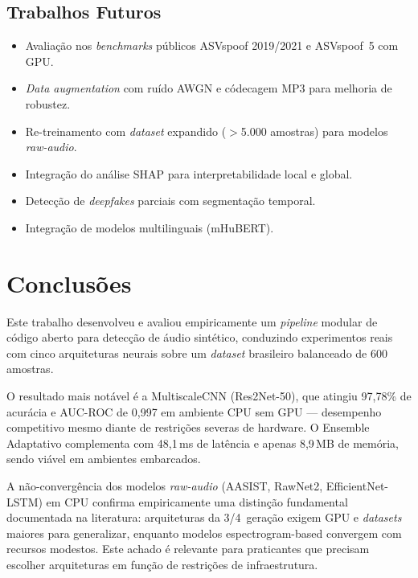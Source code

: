 \documentclass[12pt,a4paper]{article}
\begin{document}
\subsection{Trabalhos Futuros}

\begin{itemize}
    \item Avalia\c{c}\~{a}o nos \textit{benchmarks} p\'{u}blicos ASVspoof
    2019/2021 e ASVspoof~5 com GPU.
    \item \textit{Data augmentation} com ru\'{i}do AWGN e c\'{o}decagem MP3
    para melhoria de robustez.
    \item Re-treinamento com \textit{dataset} expandido ($>$5.000 amostras)
    para modelos \textit{raw-audio}.
    \item Integra\c{c}\~{a}o do an\'{a}lise SHAP para interpretabilidade
    local e global.
    \item Detec\c{c}\~{a}o de \textit{deepfakes} parciais com
    segmenta\c{c}\~{a}o temporal.
    \item Integra\c{c}\~{a}o de modelos multilinguais (mHuBERT).
\end{itemize}

\section{Conclus\~{o}es}
\label{sec:conclusao}

Este trabalho desenvolveu e avaliou empiricamente um \textit{pipeline} modular
de c\'{o}digo aberto para detec\c{c}\~{a}o de \'{a}udio sint\'{e}tico,
conduzindo experimentos reais com cinco arquiteturas neurais sobre um
\textit{dataset} brasileiro balanceado de 600 amostras.

O resultado mais not\'{a}vel \'{e} a MultiscaleCNN (Res2Net-50), que atingiu
97,78\% de acur\'{a}cia e AUC-ROC de 0,997 em ambiente CPU sem GPU ---
desempenho competitivo mesmo diante de restri\c{c}\~{o}es severas de hardware.
O Ensemble Adaptativo complementa com 48,1\,ms de lat\^{e}ncia e
apenas 8,9\,MB de mem\'{o}ria, sendo vi\'{a}vel em ambientes embarcados.

A n\~{a}o-converg\^{e}ncia dos modelos \textit{raw-audio} (AASIST, RawNet2,
EfficientNet-LSTM) em CPU confirma empiricamente uma distin\c{c}\~{a}o
fundamental documentada na literatura: arquiteturas da
3\textordfeminine/4\textordfeminine\ gera\c{c}\~{a}o exigem GPU e
\textit{datasets} maiores para generalizar, enquanto modelos
espectrogram-based convergem com recursos modestos.
Este achado \'{e} relevante para praticantes que precisam escolher
arquiteturas em fun\c{c}\~{a}o de restri\c{c}\~{o}es de infraestrutura.
\end{document}
